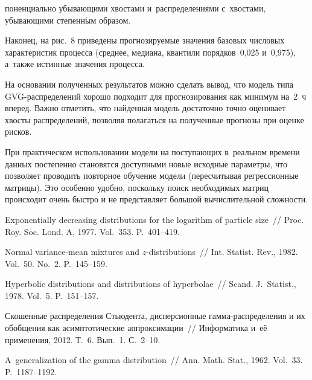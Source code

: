 \begin{multicols}{2}
\addtocounter{figure}{1}


\noindent
поненциально убывающими хвостами 
и~распределениями с~хвостами, убывающими степенн$\acute{\mbox{ы}}$м образом.




Наконец, на рис.~8 приведены прогнозируемые значения
базовых числовых характеристик процесса (среднее, медиана, квантили
порядков~0,025 и~0,975), а~также истинные значения процесса.


На основании полученных результатов можно сделать вывод, что модель
типа GVG-рас\-пре\-де\-лений хорошо подходит для прогнозирования как
минимум на~2~ч вперед. Важно отметить, что найден\-ная модель
достаточно точно оценивает хвос\-ты распределений, позволяя полагаться
на полученные прогнозы при оценке рисков.

При практическом использовании модели на поступающих в~реальном
времени данных постепенно становятся доступными новые исходные
параметры, что позволяет проводить повторное обуче\-ние модели
(пересчитывая регрессионные мат\-ри\-цы). Это особенно удобно, поскольку
поиск необходимых мат\-риц происходит очень быстро и не представляет
большой вычислительной слож\-ности.

{\small\frenchspacing
 {%
 \begin{thebibliography}{99}
 Exponentially decreasing distributions
for the logarithm of particle size~// Proc. Roy. Soc. Lond. A,
1977. Vol.~353. P.~401--419.

 Normal
variance-mean mixtures and $z$-distributions~// Int.
Statist. Rev., 1982. Vol.~50. No.~2. P.~145--159.

 Hyperbolic distributions and
distributions of hyperbolae~// Scand. J.~Statist., 1978. Vol.~5.
P.~151--157.



 Скошенные распределения
Стьюдента, дисперсионные гам\-ма-рас\-пре\-де\-ле\-ния и их обобщения как
асимптотические аппроксимации~// Информатика и~её применения, 2012.
Т.~6. Вып.~1. С.~2--10.

 A~generalization of the gamma
distribution~// Ann. Math. Stat., 1962. Vol.~33.
P.~1187--1192.


\end{thebibliography}}}
\end{multicols}
